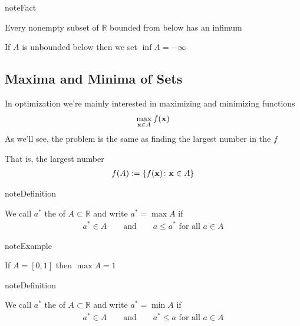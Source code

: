 \documentclass[letterpaper,10pt,english]{jupyterBook}
\begin{document}
\begin{sphinxadmonition}{note}{Fact}

\sphinxAtStartPar
Every nonempty subset of \(\mathbb{R}\) bounded from below has an infimum
\end{sphinxadmonition}

\sphinxAtStartPar
If \(A\) is unbounded below then we set \(\inf A = -\infty\)


\subsection{Maxima and Minima of Sets}
\label{\detokenize{06.optimization_fundamentals:maxima-and-minima-of-sets}}
\sphinxAtStartPar
In optimization we’re mainly interested in maximizing and minimizing functions
\begin{equation*}
\begin{split}
%
\max_{{\bf x} \in A} f({\bf x})
%
\end{split}
\end{equation*}
\sphinxAtStartPar
As we’ll see, the problem is the same as finding the largest number in the  \(f\)

\sphinxAtStartPar
That is, the largest number 
\begin{equation*}
\begin{split}
f(A) := \{ f({\bf x}) \colon {\bf x } \in A\}
\end{split}
\end{equation*}
\begin{sphinxadmonition}{note}{Definition}

\sphinxAtStartPar
We call \(a^*\) the  of \(A \subset \mathbb{R}\) and write \(a^* = \max A\) if
\begin{equation*}
\begin{split}
%
a^* \in A 
\qquad \text{and} \qquad
a \leq a^*
\text{ for all } 
a \in A 
%
\end{split}
\end{equation*}\end{sphinxadmonition}

\begin{sphinxadmonition}{note}{Example}

\sphinxAtStartPar
If \(A = [0, 1]\) then \(\max A = 1\)
\end{sphinxadmonition}

\begin{sphinxadmonition}{note}{Definition}

\sphinxAtStartPar
We call \(a^*\) the  of \(A \subset \mathbb{R}\) and write \(a^* = \min A\) if
\begin{equation*}
\begin{split}
%
a^* \in A 
\qquad \text{and} \qquad
a^* \leq a
\text{ for all } 
a \in A 
%
\end{split}
\end{equation*}\end{sphinxadmonition}
\end{document}
